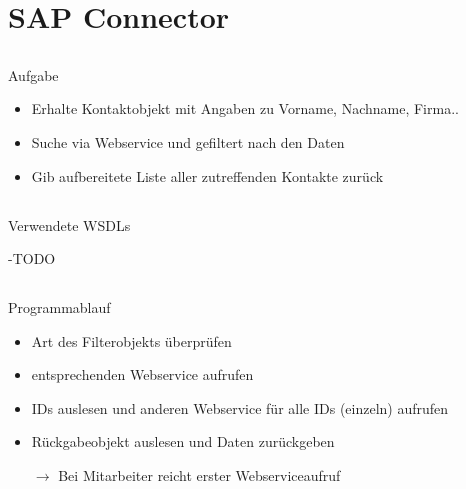 \documentclass[xcolor={usenames,dvipsnames}, compress, 10pt]{beamer}
\begin{document}


\section{SAP Connector}

\subsection*{}

\begin{frame}{Aufgabe}
\begin{center}

\begin{itemize}
\item Erhalte Kontaktobjekt mit Angaben zu Vorname, Nachname, Firma..
\item Suche via Webservice und gefiltert nach den Daten 
\item Gib aufbereitete Liste aller zutreffenden Kontakte zurück
\end{itemize}

\end{center}
\end{frame}

\subsection*{}

\begin{frame}{Verwendete WSDLs}
\begin{center}


-TODO


\end{center}
\end{frame}

\subsection*{}

\begin{frame}{Programmablauf}
\begin{center}

\begin{itemize}
\item Art des Filterobjekts überprüfen
\item entsprechenden Webservice aufrufen
\item IDs auslesen und anderen Webservice für alle IDs (einzeln) aufrufen
\item Rückgabeobjekt auslesen und Daten zurückgeben
\item[$\rightarrow$]Bei Mitarbeiter reicht erster Webserviceaufruf

\end{itemize}

\end{center}
\end{frame}
\end{document}
